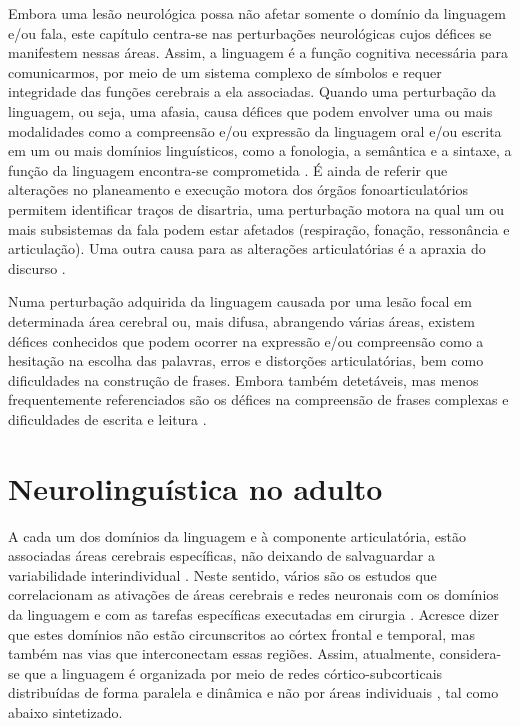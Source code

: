 \documentclass[output=paper,colorlinks,citecolor=brown,booklanguage=portuguese]{langscibook}
\begin{document}
Embora uma lesão neurológica possa não afetar somente o domínio da linguagem e/ou fala, este capítulo centra-se nas perturbações neurológicas cujos défices se manifestem nessas áreas. Assim, a linguagem é a função cognitiva necessária para comunicarmos, por meio de um sistema complexo de símbolos e requer integridade das funções cerebrais a ela associadas. Quando uma perturbação da linguagem, ou seja, uma afasia, causa défices que podem envolver uma ou mais modalidades como a compreensão e/ou expressão da linguagem oral e/ou escrita em um ou mais domínios linguísticos, como a fonologia, a semântica e a sintaxe, a função da linguagem encontra-se comprometida \citep{Witte2015}. É ainda de referir que alterações no planeamento e execução motora dos órgãos fonoarticulatórios permitem identificar traços de disartria, uma perturbação motora na qual um ou mais subsistemas da fala podem estar afetados (respiração, fonação, ressonância e articulação). Uma outra causa para as alterações articulatórias é a apraxia do discurso \citep{Stemmer2008}.

Numa perturbação adquirida da linguagem causada por uma lesão focal em determinada área cerebral ou, mais difusa, abrangendo várias áreas, existem défices conhecidos que podem ocorrer na expressão e/ou compreensão como a hesitação na escolha das palavras, erros e distorções articulatórias, bem como dificuldades na construção de frases. Embora também detetáveis, mas menos frequentemente referenciados são os défices na compreensão de frases complexas e dificuldades de escrita e leitura \citep{Bastiaanse2014}.

\section{Neurolinguística no adulto}

A cada um dos domínios da linguagem e à componente articulatória, estão associadas áreas cerebrais específicas, não deixando de salvaguardar a variabilidade interindividual \citep{Friederici2011}. Neste sentido, vários são os estudos que correlacionam as ativações de áreas cerebrais e redes neuronais com os domínios da linguagem e com as tarefas específicas executadas em cirurgia \citep{Coello2013}. Acresce dizer que estes domínios não estão circunscritos ao córtex frontal e temporal, mas também nas vias que interconectam essas regiões. Assim, atualmente, considera-se que a linguagem é organizada por meio de redes córtico-subcorticais distribuídas de forma paralela e dinâmica e não por áreas individuais \citep{Demonet2005}, tal como abaixo sintetizado.
\end{document}
